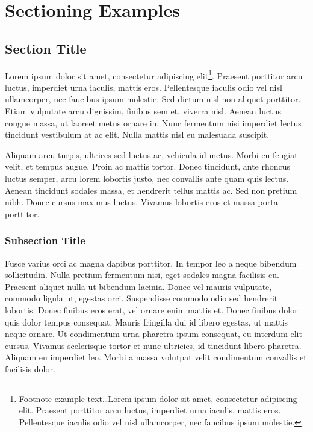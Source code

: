 \chapter{Sectioning Examples}

\section{Section Title}

Lorem ipsum dolor sit amet, consectetur adipiscing elit\footnote{Footnote example text\ldots Lorem ipsum dolor sit amet, consectetur adipiscing elit. Praesent porttitor arcu luctus, imperdiet urna iaculis, mattis eros. Pellentesque iaculis odio vel nisl ullamcorper, nec faucibus ipsum molestie.}. Praesent porttitor arcu luctus, imperdiet urna iaculis, mattis eros. Pellentesque iaculis odio vel nisl ullamcorper, nec faucibus ipsum molestie. Sed dictum nisl non aliquet porttitor. Etiam vulputate arcu dignissim, finibus sem et, viverra nisl. Aenean luctus congue massa, ut laoreet metus ornare in. Nunc fermentum nisi imperdiet lectus tincidunt vestibulum at ac elit. Nulla mattis nisl eu malesuada suscipit.

Aliquam arcu turpis, ultrices sed luctus ac, vehicula id metus. Morbi eu feugiat velit, et tempus augue. Proin ac mattis tortor. Donec tincidunt, ante rhoncus luctus semper, arcu lorem lobortis justo, nec convallis ante quam quis lectus. Aenean tincidunt sodales massa, et hendrerit tellus mattis ac. Sed non pretium nibh. Donec cursus maximus luctus. Vivamus lobortis eros et massa porta porttitor.

\subsection{Subsection Title}

Fusce varius orci ac magna dapibus porttitor. In tempor leo a neque bibendum sollicitudin. Nulla pretium fermentum nisi, eget sodales magna facilisis eu. Praesent aliquet nulla ut bibendum lacinia. Donec vel mauris vulputate, commodo ligula ut, egestas orci. Suspendisse commodo odio sed hendrerit lobortis. Donec finibus eros erat, vel ornare enim mattis et. Donec finibus dolor quis dolor tempus consequat. Mauris fringilla dui id libero egestas, ut mattis neque ornare. Ut condimentum urna pharetra ipsum consequat, eu interdum elit cursus. Vivamus scelerisque tortor et nunc ultricies, id tincidunt libero pharetra. Aliquam eu imperdiet leo. Morbi a massa volutpat velit condimentum convallis et facilisis dolor.

